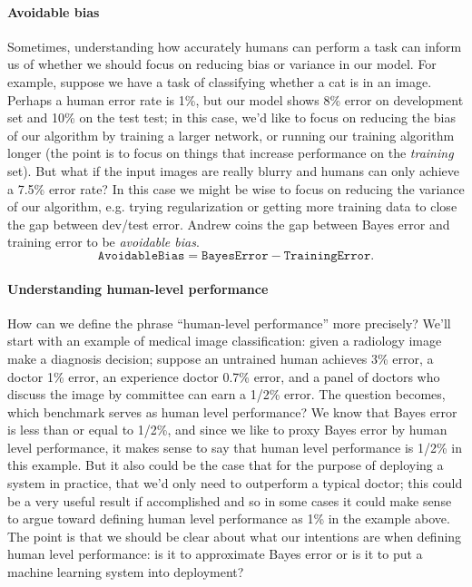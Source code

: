 \documentclass[12pt]{article}
\begin{document}
\paragraph{Avoidable bias} Sometimes, understanding how accurately humans can perform a task can inform us of whether
we should focus on reducing bias or variance in our model. For example, suppose we have a task of classifying whether
a cat is in an image. Perhaps a human error rate is 1\%, but our model shows 8\% error on development set and 10\% on
the test test; in this case, we'd like to focus on reducing the bias of our algorithm by training a larger network,
or running our training algorithm longer (the point is to focus on 
things that increase performance on the \emph{training} set). But what if the input images are really blurry and
humans can only achieve a 7.5\% error rate?  In this case we might be wise to focus on reducing the variance of our algorithm, e.g. trying regularization or getting more training data to close the gap between dev/test error. Andrew coins the gap between Bayes error and training error to be \emph{avoidable bias}.
\begin{equation*}   \texttt{AvoidableBias} = \texttt{BayesError} - \texttt{TrainingError}. \end{equation*}

\paragraph{Understanding human-level performance} How can we define the phrase ``human-level performance'' more 
precisely? We'll start with an example of medical image classification: given a radiology image make a diagnosis 
decision; suppose an untrained human achieves 3\% error, a doctor 1\% error, an experience doctor 0.7\% error, and a panel of doctors who discuss the image by committee can earn a 1/2\% error. The question becomes, which benchmark serves as human level performance? We know that Bayes error is less than or equal to 1/2\%, and since we like to proxy Bayes error by human level performance, it makes sense to say that human level performance is 1/2\% in this example. But it also could be the case that for the purpose of deploying a system in practice, that we'd only need to outperform a typical doctor; this could be a very useful result if accomplished and so in some cases it could make sense to argue toward defining human level performance as 1\% in the example above. The point is that we should be clear about what our intentions are when defining human level performance: is it to approximate Bayes error or is it to put a machine learning system into deployment?
\end{document}

